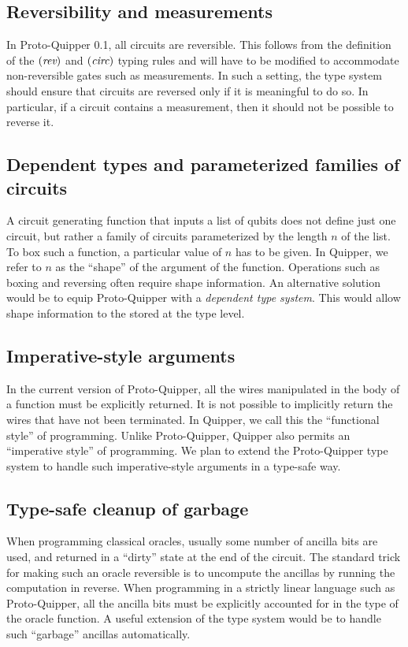 \documentclass[twoside]{article}
\begin{document}
\subsection{Reversibility and measurements}

In Proto-Quipper 0.1, all circuits are reversible. This follows from
the definition of the $(\mathop{\textit{rev}}\nolimits)$ and $(\textit{circ})$ typing rules and
will have to be modified to accommodate non-reversible gates such as
measurements. In such a setting, the type system should ensure that
circuits are reversed only if it is meaningful to do so. In
particular, if a circuit contains a measurement, then it should not be
possible to reverse it.

\subsection{Dependent types and parameterized families of circuits}
 
A circuit generating function that inputs a list of qubits does not
define just one circuit, but rather a family of circuits parameterized
by the length $n$ of the list.  To box such a function, a particular
value of $n$ has to be given. In Quipper, we refer to $n$ as the
``shape'' of the argument of the function. Operations such as boxing
and reversing often require shape information. An alternative solution
would be to equip Proto-Quipper with a {\em dependent type
  system}. This would allow shape information to the stored at the
type level.

\subsection{Imperative-style arguments}

In the current version of Proto-Quipper, all the wires manipulated in
the body of a function must be explicitly returned. It is not possible
to implicitly return the wires that have not been terminated. In
Quipper, we call this the ``functional style'' of programming. Unlike
Proto-Quipper, Quipper also permits an ``imperative style'' of
programming. We plan to extend the Proto-Quipper type system to handle
such imperative-style arguments in a type-safe way.

\subsection{Type-safe cleanup of garbage}

When programming classical oracles, usually some number of ancilla
bits are used, and returned in a ``dirty'' state at the end of the
circuit. The standard trick for making such an oracle reversible is to
uncompute the ancillas by running the computation in reverse. When
programming in a strictly linear language such as Proto-Quipper, all
the ancilla bits must be explicitly accounted for in the type of the
oracle function. A useful extension of the type system would be to
handle such ``garbage'' ancillas automatically.
\end{document}
